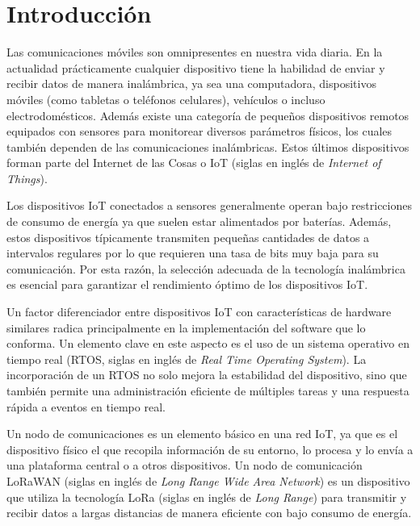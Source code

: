 \chapter{Introducción}

Las comunicaciones móviles son omnipresentes en nuestra vida diaria. En la actualidad prácticamente cualquier dispositivo tiene la habilidad de enviar y recibir datos de manera inalámbrica, ya sea una computadora, dispositivos móviles (como tabletas o teléfonos celulares), vehículos o incluso electrodomésticos. Además existe una categoría de pequeños dispositivos remotos equipados con sensores para monitorear diversos parámetros físicos, los cuales también dependen de las comunicaciones inalámbricas. Estos últimos dispositivos forman parte del Internet de las Cosas o IoT (siglas en inglés de \textit{Internet of Things}).

\vspace{0.5cm}

Los dispositivos IoT conectados a sensores generalmente operan bajo restricciones de consumo de energía ya que suelen estar alimentados por baterías. Además, estos dispositivos típicamente transmiten pequeñas cantidades de datos a intervalos regulares por lo que requieren una tasa de bits muy baja para su comunicación. Por esta razón, la selección adecuada de la tecnología inalámbrica es esencial para garantizar el rendimiento óptimo de los dispositivos IoT.\par

\vspace{0.5cm}

Un factor diferenciador entre dispositivos IoT con características de hardware similares radica principalmente en la implementación del software que lo conforma. Un elemento clave en este aspecto es el uso de un sistema operativo en tiempo real (RTOS, siglas en inglés de \textit{Real Time Operating System}). La incorporación de un RTOS no solo mejora la estabilidad del dispositivo, sino que también permite una administración eficiente de múltiples tareas y una respuesta rápida a eventos en tiempo real.

\vspace{0.5cm}

Un nodo de comunicaciones es un elemento básico en una red IoT, ya que es el dispositivo físico el que recopila información de su entorno, lo procesa y lo envía a una plataforma central o a otros dispositivos. Un nodo de comunicación LoRaWAN (siglas en inglés de \textit{Long Range Wide Area Network})  es un dispositivo que utiliza la tecnología LoRa (siglas en inglés de \textit{Long Range}) para transmitir y recibir datos a largas distancias de manera eficiente con bajo consumo de energía.

